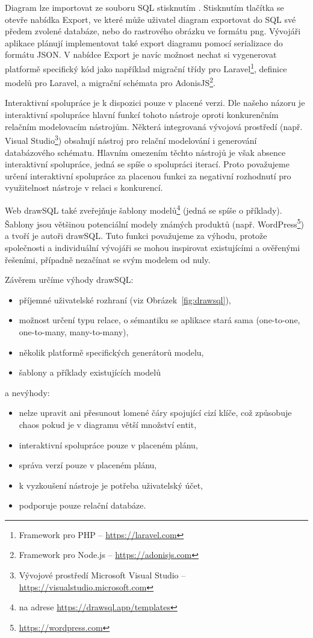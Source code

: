 Diagram lze importovat ze souboru SQL stisknutím .
Stisknutím tlačítka  se otevře nabídka Export, ve které může uživatel diagram exportovat do SQL své předem zvolené databáze, nebo do rastrového obrázku ve formátu \acrshort{png}.
Vývojáři aplikace plánují implementovat také export diagramu pomocí serializace do formátu JSON.
V nabídce Export je navíc možnost nechat si vygenerovat platformě specifický kód jako například migrační třídy pro
Laravel\footnote{Framework pro PHP -- \url{https://laravel.com}},
definice modelů pro Laravel, a migrační schémata pro
AdonisJS\footnote{Framework pro Node.js -- \url{https://adonisjs.com}}.

Interaktivní spolupráce je k dispozici pouze v placené verzi.
Dle našeho názoru je interaktivní spolupráce hlavní funkcí tohoto nástroje oproti konkurenčním relačním modelovacím nástrojům.
Některá integrovaná vývojová prostředí (např. Visual Studio\footnote{Vývojové prostředí Microsoft Visual Studio -- \url{https://visualstudio.microsoft.com}}) obsahují nástroj pro relační modelování i generování databázového schématu.
Hlavním omezením těchto nástrojů je však absence interaktivní spolupráce, jedná se spíše o spolupráci iterací.
Proto považujeme určení interaktivní spolupráce za placenou funkci za negativní rozhodnutí pro využitelnost nástroje v relaci s konkurencí.

Web drawSQL také zveřejňuje šablony modelů\footnote{na adrese \url{https://drawsql.app/templates}} (jedná se spíše o příklady).
Šablony jsou většinou potenciální modely známých produktů (např. WordPress\footnote{\url{https://wordpress.com}}) a tvoří je autoři drawSQL.
Tuto funkci považujeme za výhodu, protože společnosti a individuální vývojáři se mohou inspirovat existujícími a ověřenými řešeními, případně nezačínat se svým modelem od nuly.

Závěrem určíme výhody drawSQL:
\begin{itemize}
  \item příjemné uživatelské rozhraní (viz Obrázek~\ref{fig:drawsql}),
  \item možnost určení typu relace, o sémantiku se aplikace stará sama (one-to-one, one-to-many, many-to-many),
  \item několik platformě specifických generátorů modelu,
  \item šablony a příklady existujících modelů
\end{itemize}
a nevýhody:
\begin{itemize}
  \item nelze upravit ani přesunout lomené čáry spojující cizí klíče, což způsobuje chaos pokud je v diagramu větší množství entit,
  \item interaktivní spolupráce pouze v placeném plánu,
  \item správa verzí pouze v placeném plánu,
  \item k vyzkoušení nástroje je potřeba uživatelský účet,
  \item podporuje pouze relační databáze.
\end{itemize}


